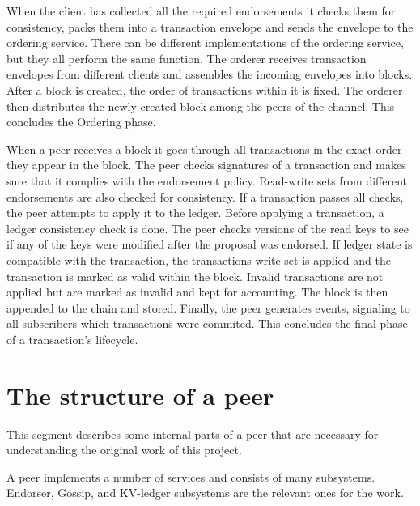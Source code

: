 When the client has collected all the required endorsements it checks them for consistency, packs them into a transaction envelope and sends the envelope to the ordering service. There can be different implementations of the ordering service, but they all perform the same function. The orderer receives transaction envelopes from different clients and assembles the incoming envelopes into blocks. After a  block is created, the order of transactions within it is fixed. The orderer then distributes the newly created block among the peers of the channel. This concludes the Ordering phase.

When a peer receives a block it goes through all transactions in the exact order they appear in the block. The peer checks signatures of a transaction and makes sure that it complies with the endorsement policy. Read-write sets from different endorsements are also checked for consistency. If a transaction passes all checks, the peer attempts to apply it to the ledger. Before applying a transaction, a ledger consistency check is done. The peer checks versions of the read keys to see if any of the keys were modified after the proposal was endorsed. If ledger state is compatible with the transaction, the transactions write set is applied and the transaction is marked as valid within the block. Invalid transactions are not applied but are marked as invalid and kept for accounting. The block is then appended to the chain and stored. Finally, the peer generates events, signaling to all subscribers which transactions were commited. This concludes the final phase of a transaction's lifecycle.

\section{The structure of a peer}
\label{sec:back-peer}
This segment describes some internal parts of a peer that are necessary for understanding the original work of this project.

A peer implements a number of services and consists of many subsystems. Endorser, Gossip, and KV-ledger subsystems are the relevant ones for the work.

